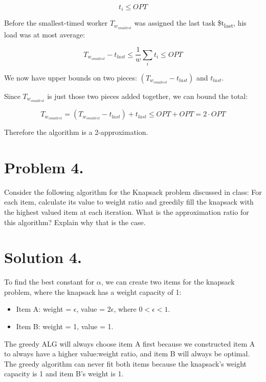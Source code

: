 \documentclass[11pt]{article}
\begin{document}
\[t_i \leq OPT \]

Before the smallest-timed worker \(T_w_{smallest}\) was assigned the last task \$t\textsubscript{last}, his load was at most average:

\[ T_w_{smallest} - t_{last} \leq \frac{1}{w} \sum_{i} t_i \leq OPT \]

We now have upper bounds on two pieces: \((T_{w_{smallest}} - t_{last})\) and \(t_{last}\).

Since \(T_{w_{smallest}}\) is just those two pieces added together, we can bound the total:

\[ T_{w_{smallest}} = (T_{w_{smallest}} - t_{last}) + t_{last} \leq OPT + OPT = 2 \cdot OPT \]

Therefore the algorithm is a 2-approximation.

\newpage

\section{Problem 4.}
\label{sec:org8150687}

Consider the following algorithm for the Knapsack problem discussed in class: For each item, calculate its value to weight ratio and greedily fill the knapsack with the highest valued item at each iteration. What is the approximation ratio for this algorithm? Explain why that is the case.



\section{Solution 4.}
\label{sec:orgc537194}


To find the best constant for \(\alpha\), we can create two items for the knapsack problem, where the knapsack has a weight capacity of 1:

\begin{itemize}
\item Item A: weight = \(\epsilon\), value = \(2 \epsilon\), where \(0 < \epsilon < 1\).
\item Item B: weight = 1, value = 1.
\end{itemize}

The greedy ALG will always choose item A first because we constructed item A to always have a higher value:weight ratio, and item B will always be optimal. The greedy algorithm can never fit both items because the knapsack's weight capacity is 1 and item B's weight is 1. 
\end{document}
